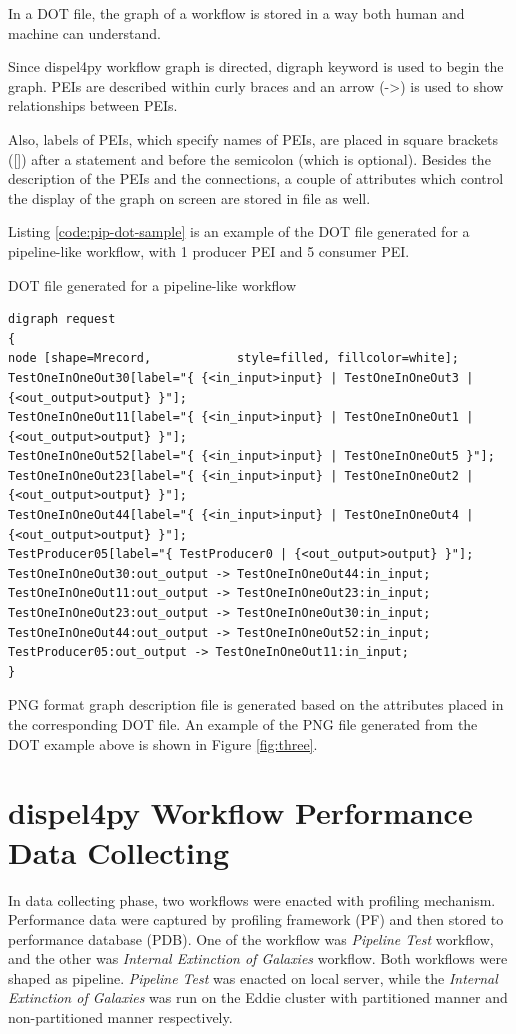 \documentclass[10pt,twoside,openright,logo]{report}
\begin{document}
In a DOT file, the graph of a workflow is stored in a way both human and machine can understand.

Since dispel4py workflow graph is directed, digraph keyword is used to begin the graph. PEIs are described within curly braces and an arrow (->) is used to show relationships between PEIs.

Also, labels of PEIs, which specify names of PEIs, are placed in square brackets ([]) after a statement and before the semicolon (which is optional).
Besides the description of the PEIs and the connections, a couple of attributes which control the display of the graph on screen are stored in file as well.

Listing \ref{code:pip-dot-sample} is an example of the DOT file generated for a pipeline-like workflow, with 1 producer PEI and 5 consumer PEI.
\begin{listing}
\caption{DOT file generated for a pipeline-like workflow}
\label{code:pip-dot-sample}
\begin{verbatim}
digraph request
{
node [shape=Mrecord,            style=filled, fillcolor=white];
TestOneInOneOut30[label="{ {<in_input>input} | TestOneInOneOut3 | {<out_output>output} }"];
TestOneInOneOut11[label="{ {<in_input>input} | TestOneInOneOut1 | {<out_output>output} }"];
TestOneInOneOut52[label="{ {<in_input>input} | TestOneInOneOut5 }"];
TestOneInOneOut23[label="{ {<in_input>input} | TestOneInOneOut2 | {<out_output>output} }"];
TestOneInOneOut44[label="{ {<in_input>input} | TestOneInOneOut4 | {<out_output>output} }"];
TestProducer05[label="{ TestProducer0 | {<out_output>output} }"];
TestOneInOneOut30:out_output -> TestOneInOneOut44:in_input;
TestOneInOneOut11:out_output -> TestOneInOneOut23:in_input;
TestOneInOneOut23:out_output -> TestOneInOneOut30:in_input;
TestOneInOneOut44:out_output -> TestOneInOneOut52:in_input;
TestProducer05:out_output -> TestOneInOneOut11:in_input;
}
\end{verbatim}
\end{listing}

\figthree
PNG format graph description file is generated based on the attributes placed in the corresponding DOT file.
An example of the PNG file generated from the DOT example above is shown in Figure \ref{fig:three}.

\chapter{dispel4py Workflow Performance Data Collecting}
In data collecting phase, two workflows were enacted with profiling mechanism. Performance data were captured by profiling framework (PF) and then stored to performance database (PDB).
One of the workflow was \textit{Pipeline Test} workflow, and the other was \textit{Internal Extinction of Galaxies} workflow. Both workflows were shaped as pipeline.
\textit{Pipeline Test} was enacted on local server, while the \textit{Internal Extinction of Galaxies} was run on the Eddie cluster with partitioned manner and non-partitioned manner respectively.
\end{document}
